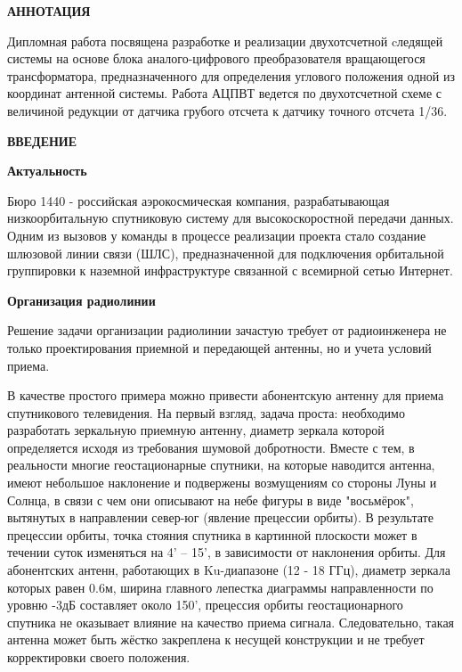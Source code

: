 \newpage
\begin{center}
  \textbf{\large АННОТАЦИЯ}
\end{center}

Дипломная работа посвящена разработке и реализации двухотсчетной cледящей системы на основе блока аналого-цифрового преобразователя вращающегося трансформатора, 
предназначенного для определения углового положения одной из координат антенной системы. Работа АЦПВТ ведется по двухотсчетной схеме с величиной редукции от датчика грубого отсчета к датчику точного отсчета 1/36.


\onehalfspacing
\setcounter{page}{2}

\newpage
\renewcommand{\contentsname}{\centerline{\large СОДЕРЖАНИЕ}}
\tableofcontents

\newpage
\begin{center}
  \textbf{\large ВВЕДЕНИЕ}
\end{center}


\textbf{Актуальность} 

Бюро 1440 - российская аэрокосмическая компания, разрабатывающая низкоорбитальную спутниковую систему для высокоскоростной передачи данных. 
Одним из вызовов у команды в процессе реализации проекта стало создание шлюзовой линии связи (ШЛС), 
предназначенной для подключения орбитальной группировки к наземной инфраструктуре связанной с всемирной сетью Интернет.

\textbf{Организация радиолинии}

Решение задачи организации радиолинии зачастую требует от радиоинженера не только проектирования приемной и передающей антенны, но и учета условий приема. 

В качестве простого примера можно привести абонентскую антенну для приема спутникового телевидения. 
На первый взгляд, задача проста: необходимо разработать зеркальную приемную антенну, диаметр зеркала которой определяется исходя из требования шумовой добротности. 
Вместе с тем, в реальности многие геостационарные спутники, на которые наводится антенна, имеют небольшое наклонение и подвержены возмущениям со стороны Луны и Солнца, 
в связи с чем они описывают на небе фигуры в виде "восьмёрок", вытянутых в направлении север-юг (явление прецессии орбиты). 
В результате прецессии орбиты, точка стояния спутника в картинной плоскости может в течении суток изменяться на 4' – 15', в зависимости от наклонения орбиты. 
Для абонентских антенн, работающих в Ku-диапазоне (12 - 18 ГГц), диаметр зеркала которых равен 0.6м, ширина главного лепестка диаграммы направленности по уровню -3дБ составляет около 150', 
прецессия орбиты геостационарного спутника не оказывает влияние на качество приема сигнала. Следовательно, такая антенна может быть жёстко закреплена к несущей конструкции 
и не требует корректировки своего положения. 

